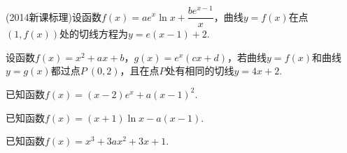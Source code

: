 \documentclass{BHCexam}
\begin{document}
\begin{questions}
\kongbai
\question
(2014新课标理)设函数$f(x)=ae^x\ln x+\dfrac{be^{x-1}}{x}$，曲线$y=f(x)$在点$(1,f(x))$处的切线方程为$y=e(x-1)+2$.
\kongbai
\question
设函数$f(x)=x^2+ax+b$，$g(x)=e^x(cx+d)$，若曲线$y=f(x)$和曲线$y=g(x)$都过点$P~(0,2)$，且在点$P$处有相同的切线$y=4x+2$.
\kongbai
\question
已知函数$f(x)=(x-2)e^x+a(x-1)^2$.
\kongbai
\qs 已知函数$f(x)=(x+1)\ln x-a(x-1)$.
\newpage
\qs
已知函数$f(x)=x^3+3ax^2+3x+1$.
\begin{parts}

\end{parts}
\end{questions}
\end{document}
